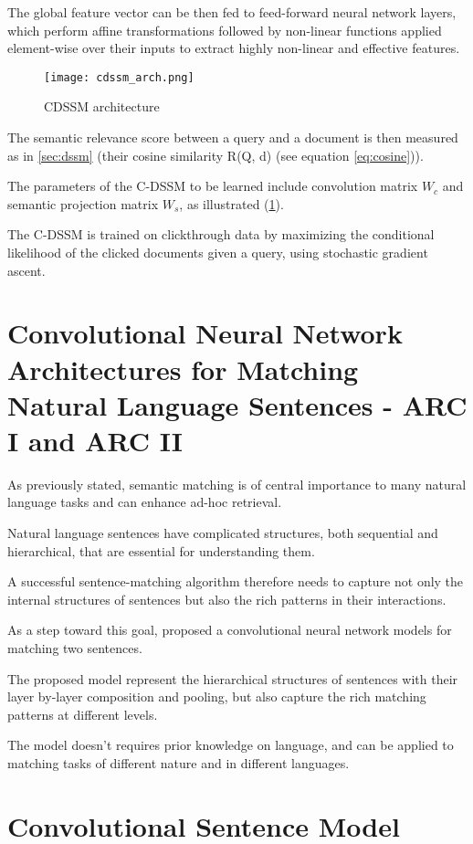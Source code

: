 The global feature vector can be then fed to feed-forward neural network layers,
which perform affine transformations followed by non-linear functions applied
element-wise over their inputs to extract highly non-linear and effective
features.

\begin{figure}[H]
  \centering
  \texttt{[image: cdssm\_arch.png]}
  \caption{CDSSM architecture}
  \label{fig:cdssm_arch}
\end{figure}

The semantic relevance score between a query and a document is then measured
as in \ref{sec:dssm} (their cosine similarity R(Q, d) (see equation
\ref{eq:cosine})).

The parameters of the C-DSSM to be learned include convolution matrix $W_c$ and
semantic projection matrix $W_s$, as  illustrated (\ref{fig:cdssm_arch}).

The C-DSSM is trained on clickthrough data by maximizing the conditional
likelihood of the clicked documents given a query, using stochastic gradient
ascent.

\section{Convolutional Neural Network Architectures for
Matching Natural Language Sentences - ARC I and ARC II}

As previously stated, semantic matching is of central importance to many natural
language tasks and can enhance ad-hoc retrieval.

Natural language sentences have complicated structures, both sequential and
hierarchical, that are essential for understanding them.

A successful sentence-matching algorithm therefore needs to capture not only
the internal structures of sentences but also the rich patterns in their
interactions.

As a step toward this goal, \cite{arc} proposed a convolutional neural network
models for matching two sentences.

The proposed model represent the hierarchical structures of
sentences with their layer by-layer composition and pooling, but also capture
the rich matching patterns at different levels.

The model doesn't requires prior knowledge on language, and can be applied to
matching tasks of different nature and in different languages.

\section{Convolutional Sentence Model}
\label{sec:arcI}

